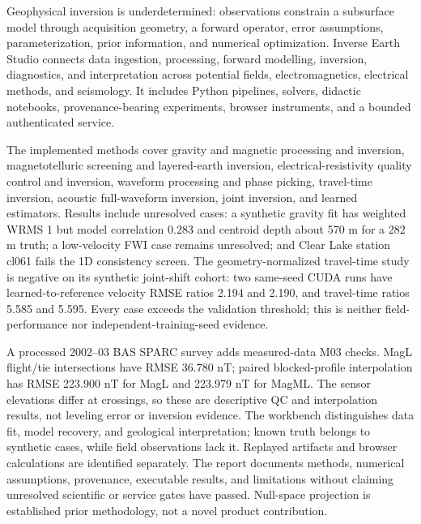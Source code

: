 Geophysical inversion is underdetermined: observations constrain a subsurface model through acquisition geometry, a forward operator, error assumptions, parameterization, prior information, and numerical optimization. Inverse Earth Studio connects data ingestion, processing, forward modelling, inversion, diagnostics, and interpretation across potential fields, electromagnetics, electrical methods, and seismology. It includes Python pipelines, solvers, didactic notebooks, provenance-bearing experiments, browser instruments, and a bounded authenticated service.

The implemented methods cover gravity and magnetic processing and inversion, magnetotelluric screening and layered-earth inversion, electrical-resistivity quality control and inversion, waveform processing and phase picking, travel-time inversion, acoustic full-waveform inversion, joint inversion, and learned estimators. Results include unresolved cases: a synthetic gravity fit has weighted WRMS 1 but model correlation 0.283 and centroid depth about 570 m for a 282 m truth; a low-velocity FWI case remains unresolved; and Clear Lake station cl061 fails the 1D consistency screen. The geometry-normalized travel-time study is negative on its synthetic joint-shift cohort: two same-seed CUDA runs have learned-to-reference velocity RMSE ratios 2.194 and 2.190, and travel-time ratios 5.585 and 5.595. Every case exceeds the validation threshold; this is neither field-performance nor independent-training-seed evidence.

A processed 2002--03 BAS SPARC survey adds measured-data M03 checks. MagL flight/tie intersections have RMSE 36.780 nT; paired blocked-profile interpolation has RMSE 223.900 nT for MagL and 223.979 nT for MagML. The sensor elevations differ at crossings, so these are descriptive QC and interpolation results, not leveling error or inversion evidence. The workbench distinguishes data fit, model recovery, and geological interpretation; known truth belongs to synthetic cases, while field observations lack it. Replayed artifacts and browser calculations are identified separately. The report documents methods, numerical assumptions, provenance, executable results, and limitations without claiming unresolved scientific or service gates have passed. Null-space projection is established prior methodology, not a novel product contribution.
